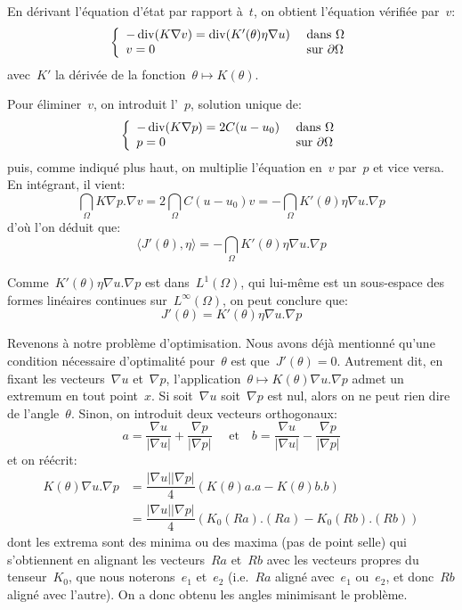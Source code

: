 En dérivant l'équation d'état par rapport à~$t$, on obtient l'équation vérifiée par~$v$:
\[\left\{\begin{array}{ll} -\operatorname{div}(K\nabla v)=\operatorname{div}(K'(\theta)\eta\nabla u) &\text{ dans }\Omega \\ v=0 &\text{ sur }\partial\Omega \end{array}\right. \]
avec~$K'$ la dérivée de la fonction~$\theta \mapsto K(\theta)$.

Pour éliminer~$v$, on introduit l'~$p$, solution unique de:
\[\left\{\begin{array}{ll} -\operatorname{div}(K\nabla p)=2C(u-u_0) &\text{ dans }\Omega \\ p=0 &\text{ sur }\partial\Omega \end{array}\right. \]
puis, comme indiqué plus haut, on multiplie l'équation en~$v$ par~$p$ et vice versa. En intégrant, il vient:
\[ \dint_\Omega K\nabla p.\nabla v = 2\dint_\Omega C(u-u_0)v = -\dint_\Omega K'(\theta)\eta\nabla u.\nabla p \]
d'où l'on déduit que:
\[ \langle J'(\theta),\eta\rangle =  -\dint_\Omega K'(\theta)\eta\nabla u.\nabla p \]

Comme~$K'(\theta)\eta\nabla u.\nabla p$ est dans~$L^1(\Omega)$, qui lui-même est un sous-espace des formes linéaires continues sur~$L^\infty(\Omega)$, on peut conclure que:
\[ J'(\theta) =  K'(\theta)\eta\nabla u.\nabla p \]

\medskip
Revenons à notre problème d'optimisation. Nous avons déjà mentionné qu'une condition nécessaire d'optimalité pour~$\theta$ est que~$J'(\theta)=0$. Autrement dit, en fixant les vecteurs~$\nabla u$ et~$\nabla p$, l'application~$\theta \mapsto K(\theta)\nabla u.\nabla p$ admet un extremum en tout point~$x$. Si soit~$\nabla u$ soit~$\nabla p$ est nul, alors on ne peut rien dire de l'angle~$\theta$. Sinon, on introduit deux vecteurs orthogonaux:
\[ a=\dfrac{\nabla u}{|\nabla u|}+\dfrac{\nabla p}{|\nabla p|} \quad \text{ et}\quad
b=\dfrac{\nabla u}{|\nabla u|}-\dfrac{\nabla p}{|\nabla p|} \]
et on réécrit:
\[\begin{array}{ll}
K(\theta)\nabla u.\nabla p &= \dfrac{|\nabla u||\nabla p|}{4}(K(\theta)a.a -K(\theta)b.b)\\
&= \dfrac{|\nabla u||\nabla p|}{4}(K_0(Ra).(Ra)-K_0(Rb).(Rb))
\end{array}\]
dont les extrema sont des minima ou des maxima (pas de point selle) qui s'obtiennent en alignant les vecteurs~$Ra$ et~$Rb$ avec les vecteurs propres du tenseur~$K_0$, que nous noterons~$e_1$ et~$e_2$ (i.e.~$Ra$ aligné avec~$e_1$ ou~$e_2$, et donc~$Rb$ aligné avec l'autre).
On a donc obtenu les angles minimisant le problème.

